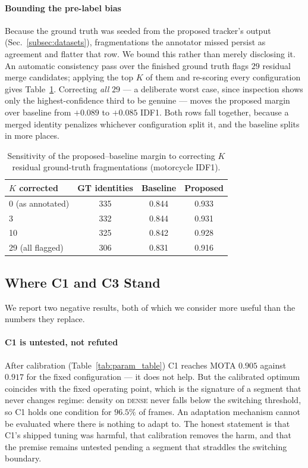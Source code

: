 \paragraph{Bounding the pre-label bias}
Because the ground truth was seeded from the proposed tracker's output
(Sec.~\ref{subsec:datasets}), fragmentations the annotator missed persist
as agreement and flatter that row.
We bound this rather than merely disclosing it.
An automatic consistency pass over the finished ground truth flags $29$
residual merge candidates; applying the top $K$ of them and re-scoring
every configuration gives Table~\ref{tab:bias}.
Correcting \emph{all} $29$ --- a deliberate worst case, since inspection
shows only the highest-confidence third to be genuine --- moves the
proposed margin over baseline from $+0.089$ to $+0.085$ IDF1.
Both rows fall together, because a merged identity penalizes whichever
configuration split it, and the baseline splits in more places.

\begin{table}[h]
  \centering
  \caption{Sensitivity of the proposed--baseline margin to correcting
           $K$ residual ground-truth fragmentations (motorcycle IDF1).}
  \label{tab:bias}
  \begin{tabular}{lccc}
    \toprule
    $K$ corrected & GT identities & Baseline & Proposed \\
    \midrule
    0 (as annotated) & 335 & 0.844 & 0.933 \\
    3                & 332 & 0.844 & 0.931 \\
    10               & 325 & 0.842 & 0.928 \\
    29 (all flagged) & 306 & 0.831 & 0.916 \\
    \bottomrule
  \end{tabular}
\end{table}

\subsection{Where C1 and C3 Stand}
\label{subsec:c3_limits}

We report two negative results, both of which we consider more useful
than the numbers they replace.

\paragraph{C1 is untested, not refuted}
After calibration (Table~\ref{tab:param_table}) C1 reaches MOTA $0.905$
against $0.917$ for the fixed configuration --- it does not help.
But the calibrated optimum coincides with the fixed operating point,
which is the signature of a segment that never changes regime: density
on \textsc{dense} never falls below the switching threshold, so C1 holds
one condition for $96.5\%$ of frames.
An adaptation mechanism cannot be evaluated where there is nothing to
adapt to.
The honest statement is that C1's shipped tuning was harmful, that
calibration removes the harm, and that the premise remains untested
pending a segment that straddles the switching boundary.

